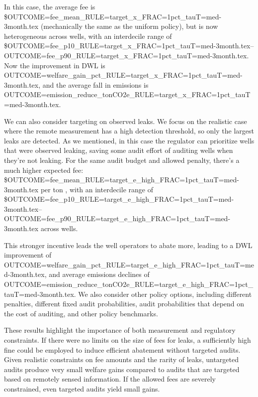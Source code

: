\documentclass[12pt,oneside,letterpaper]{article}
\theoremstyle{definition}
\begin{document}
\begin{refsection}
In this case, the average fee is
\${OUTCOME=fee_mean_RULE=target_x_FRAC=1pct_tauT=med-3month.tex} (mechanically the same as the uniform policy), but is now heterogeneous across wells, with an interdecile range of
\${OUTCOME=fee_p10_RULE=target_x_FRAC=1pct_tauT=med-3month.tex}--%
{OUTCOME=fee_p90_RULE=target_x_FRAC=1pct_tauT=med-3month.tex}.
Now the improvement in \gls{DWL} is
{OUTCOME=welfare_gain_pct_RULE=target_x_FRAC=1pct_tauT=med-3month.tex},
and the average fall in emissions is
{OUTCOME=emission_reduce_tonCO2e_RULE=target_x_FRAC=1pct_tauT=med-3month.tex}.

We can also consider targeting on observed leaks.
We focus on the realistic case where the remote measurement has a high detection threshold, so only the largest leaks are detected.
As we mentioned, in this case the regulator can prioritize wells that were observed leaking, saving some audit effort of auditing wells when they're not leaking.
For the same audit budget and allowed penalty, there's a much higher expected fee:
\${OUTCOME=fee_mean_RULE=target_e_high_FRAC=1pct_tauT=med-3month.tex} per ton ,
with an interdecile range of
\${OUTCOME=fee_p10_RULE=target_e_high_FRAC=1pct_tauT=med-3month.tex}--%
{OUTCOME=fee_p90_RULE=target_e_high_FRAC=1pct_tauT=med-3month.tex}
across wells.

This stronger incentive leads the well operators to abate more, leading to
a \gls{DWL} improvement of
{OUTCOME=welfare_gain_pct_RULE=target_e_high_FRAC=1pct_tauT=med-3month.tex},
and average emissions declines of
{OUTCOME=emission_reduce_tonCO2e_RULE=target_e_high_FRAC=1pct_tauT=med-3month.tex}.
We also consider other policy options, including different penalties, different fixed audit probabilities, audit probabilities that depend on the cost of auditing, and other policy benchmarks.

These results highlight the importance of both measurement and regulatory constraints.
If there were no limits on the size of fees for leaks, a sufficiently high fine could be employed to induce efficient abatement without targeted audits.
Given realistic constraints on fee amounts and the rarity of leaks, untargeted audits produce very small welfare gains compared to audits that are targeted based on remotely sensed information.
If the allowed fees are severely constrained, even targeted audits yield small gains.


\end{refsection}
\end{document}
